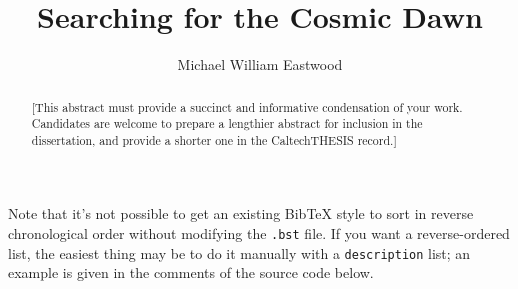 \documentclass[12pt]{caltech_thesis}
\begin{document}
\title{Searching for the Cosmic Dawn}
\author{Michael William Eastwood}

\address{Pasadena, California}                     %



\maketitle[logo]

\begin{acknowledgements}
\end{acknowledgements}

\begin{abstract}
    [This abstract must provide a succinct and informative condensation of your work. Candidates are welcome to prepare a lengthier abstract for inclusion in the dissertation, and provide a shorter one in the CaltechTHESIS record.]
\end{abstract}



\begin{publishedcontent}%
\nocite{Cahn:etal:2015,Cahn:etal:2016}
\putbib[ownpubs]
\end{publishedcontent}

Note that it's not possible to get an existing BibTeX style to sort in reverse chronological order without modifying the \texttt{.bst} file. If you want a reverse-ordered list, the easiest thing may be to do it manually with a \texttt{description} list; an example is given in the comments of the source code below.
\end{document}
